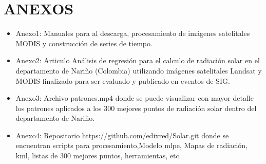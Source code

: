\documentclass[bsc,letterpaper,12pt]{csthesis}
\begin{document}
\pagestyle{empty}%





\tableofcontents














\chapter*{ ANEXOS}

\begin{itemize}
 \item Anexo1: Manuales para al descarga, procesamiento de imágenes satelitales MODIS y construcción de series de tiempo.
 \item Anexo2: Articulo Análisis de regresión para el calculo de radiación solar en el departamento de Nariño (Colombia) utilizando imágenes 
  satelitales Landsat y MODIS finalizado para ser evaluado y publicado en eventos de SIG.
 \item Anexo3: Archivo patrones.mp4 donde se puede visualizar con mayor detalle los patrones aplicados a los 300 mejores puntos de radiación solar dentro del 
 departamento de Nariño.
 \item Anexo4: Repositorio https://github.com/edixred/Solar.git donde se encuentran scripts para procesamiento,Modelo mlpe, Mapas de radiación, kml, listas 
 de 300 mejores puntos, herramientas, etc.
 
\end{itemize}
\end{document}
